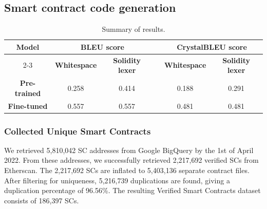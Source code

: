 \documentclass[12pt]{book}
\begin{document}
\subsection{Smart contract code generation}

\begin{table}[htp]
\centering
\caption{Summary of results.}\label{tab:eval-summary}
\begin{threeparttable}
    \def\arraystretch{1.5}
    \setlength\tabcolsep{2pt} %
    
    \begin{tabular}{cccp{2pt}cc}%
        \toprule
        \textbf{Model} & \multicolumn{2}{c}{\textbf{BLEU score}} & & \multicolumn{2}{c}{\textbf{CrystalBLEU score}}\\\cline{2-3}\cline{5-6}
         & \textbf{Whitespace} & \textbf{Solidity lexer} & & \textbf{Whitespace} & \textbf{Solidity lexer} \\
        \midrule
        \textbf{Pre-trained} & 0.258 & 0.414 & & 0.188 & 0.291\\
        \textbf{Fine-tuned} & 0.557 & 0.557 & & 0.481 & 0.481 \\

       \bottomrule
    \end{tabular}
\end{threeparttable}
\end{table}

\subsubsection{Collected Unique Smart Contracts}
We retrieved 5,810,042 SC addresses from Google BigQuery by the 1st of April 2022. From these addresses, we successfully retrieved 2,217,692 verified SCs from Etherscan. The 2,217,692 SCs are inflated to 5,403,136 separate contract files. After filtering for uniqueness, 5,216,739 duplications are found, giving a duplication percentage of 96.56\%. The resulting Verified Smart Contracts dataset consists of 186,397 SCs. 
\end{document}

